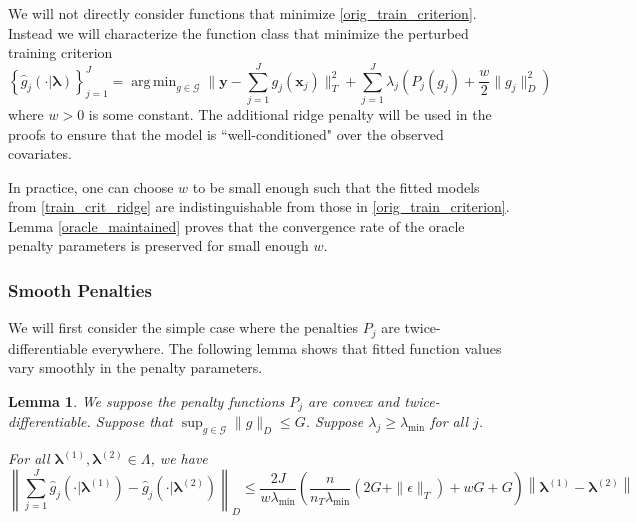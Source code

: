 \documentclass[12pt]{article}
\newtheorem{lemma}{Lemma}
\DeclareMathOperator*{\argmin}{arg\,min}
\begin{document}
We will not directly consider functions that minimize \eqref{orig_train_criterion}. Instead we will characterize the function class that minimize the perturbed training criterion
\begin{equation}
\label{train_crit_ridge}
\left\{ \hat{g}_j(\cdot | \boldsymbol \lambda) \right \}_{j=1}^J = \argmin_{g\in \mathcal{G}} \| \boldsymbol y -  \sum_{j=1}^J g_j(\boldsymbol x_j) \|^2_T + \sum_{j=1}^J \lambda_j \left ( P_j(g_j) + \frac{w}{2} \| g_j \|^2_D \right )
\end{equation}
where $w > 0$ is some constant. The additional ridge penalty will be used in the proofs to ensure that the model is ``well-conditioned" over the observed covariates.

In practice, one can choose $w$ to be small enough such that the fitted models from \eqref{train_crit_ridge} are indistinguishable from those in \eqref{orig_train_criterion}. Lemma \ref{oracle_maintained} proves that the convergence rate of the oracle penalty parameters is preserved for small enough $w$.

\subsubsection{Smooth Penalties}
We will first consider the simple case where the penalties $P_j$ are twice-differentiable everywhere. The following lemma shows that fitted function values vary smoothly in the penalty parameters.

\begin{lemma}
\label{lemma:smooth}
We suppose the penalty functions $P_{j}$ are convex and twice-differentiable.
Suppose that $\sup_{g\in\mathcal{G}}\|g\|_{D}\le G$.
Suppose $\lambda_j \ge \lambda_{\min}$ for all $j$.


For all $\boldsymbol \lambda^{(1)}, \boldsymbol \lambda^{(2)} \in \Lambda$, we have
\[
\left \|
\sum_{j=1}^{J}\hat{g}_{j}(\cdot| \boldsymbol \lambda^{(1)})-\hat{g}_{j}(\cdot| \boldsymbol \lambda^{(2)})
\right \|_{D}
\le
\frac{2J}{w\lambda_{\min}}\left(\frac{n}{n_T \lambda_{\min} }\left(2G+\|\epsilon\|_{T}\right)+wG+G\right) 
\left \|
\boldsymbol \lambda^{(1)}- \boldsymbol \lambda^{(2)}
\right \|
\]
\end{lemma}
\end{document}
